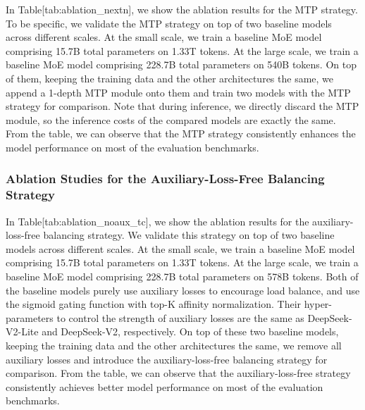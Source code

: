 \documentclass[11pt,a4paper]{article}
\begin{document}
In Table[tab:ablation\_nextn], we show the ablation results for the MTP strategy. To be specific, we validate the MTP strategy on top of two baseline models across different scales. At the small scale, we train a baseline MoE model comprising 15.7B total parameters on 1.33T tokens. At the large scale, we train a baseline MoE model comprising 228.7B total parameters on 540B tokens. On top of them, keeping the training data and the other architectures the same, we append a 1-depth MTP module onto them and train two models with the MTP strategy for comparison. Note that during inference, we directly discard the MTP module, so the inference costs of the compared models are exactly the same. From the table, we can observe that the MTP strategy consistently enhances the model performance on most of the evaluation benchmarks.

\subsubsection{Ablation Studies for the Auxiliary-Loss-Free Balancing Strategy}

In Table[tab:ablation\_noaux\_tc], we show the ablation results for the auxiliary-loss-free balancing strategy. We validate this strategy on top of two baseline models across different scales. At the small scale, we train a baseline MoE model comprising 15.7B total parameters on 1.33T tokens. At the large scale, we train a baseline MoE model comprising 228.7B total parameters on 578B tokens. Both of the baseline models purely use auxiliary losses to encourage load balance, and use the sigmoid gating function with top-K affinity normalization. Their hyper-parameters to control the strength of auxiliary losses are the same as DeepSeek-V2-Lite and DeepSeek-V2, respectively. On top of these two baseline models, keeping the training data and the other architectures the same, we remove all auxiliary losses and introduce the auxiliary-loss-free balancing strategy for comparison. From the table, we can observe that the auxiliary-loss-free strategy consistently achieves better model performance on most of the evaluation benchmarks.
\end{document}
